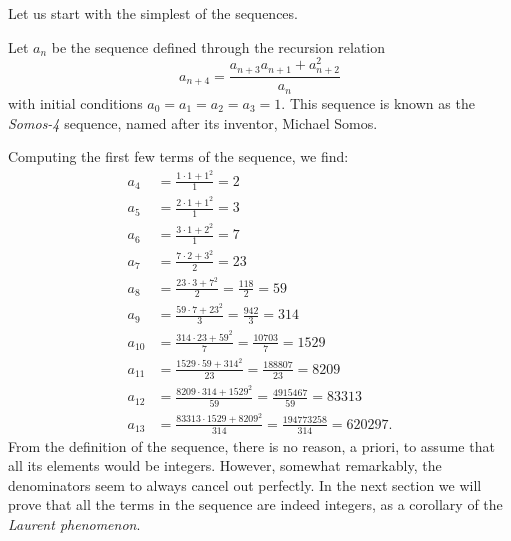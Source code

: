 \documentclass{article}
\begin{document}
Let us start with the simplest of the sequences.
\begin{definition}
	Let $a_n$ be the sequence defined through the recursion relation
	\begin{equation}
		\label{eq:somos_4}
		a_{n+4} = \frac{a_{n+3}a_{n+1}+ a_{n+2}^2}{a_n}
	\end{equation}
	with initial conditions $a_0 = a_1 = a_2 = a_3 = 1$. This sequence is known as the \emph{Somos-4} sequence, named after its inventor, Michael Somos.
\end{definition}
Computing the first few terms of the sequence, we find:
\begin{align*}
	a_4    & = \frac{1 \cdot 1 + 1^2}{1} = 2                                           \\
	a_5    & = \frac{2 \cdot 1 + 1^2}{1} = 3                                           \\
	a_6    & = \frac{3 \cdot 1 + 2^2}{1} = 7                                           \\
	a_7    & = \frac{7 \cdot 2 + 3^2}{2} = 23                                          \\
	a_8    & = \frac{23 \cdot 3 + 7^2}{2} = \frac{118}{2} = 59                         \\
	a_9    & = \frac{59 \cdot 7 + 23^2}{3} = \frac{942}{3} = 314                       \\
	a_{10} & = \frac{314 \cdot 23 + 59^2}{7} = \frac{10703}{7} = 1529                  \\
	a_{11} & = \frac{1529 \cdot 59 + 314^2}{23} = \frac{188807}{23} = 8209             \\
	a_{12} & = \frac{8209 \cdot 314 + 1529^2}{59} = \frac{4915467}{59} = 83313         \\
	a_{13} & = \frac{83313 \cdot 1529 + 8209^2}{314} = \frac{194773258}{314} = 620297.
\end{align*}
From the definition of the sequence, there is no reason, a priori, to assume that all its elements would be integers. However, somewhat remarkably, the denominators seem to always cancel out perfectly. In the next section we will prove that all the terms in the sequence are indeed integers,
as a corollary of the \emph{Laurent phenomenon}.
\end{document}
